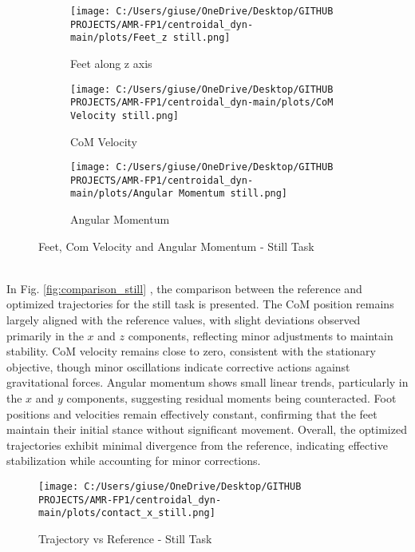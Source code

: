 \documentclass[main.tex]{subfiles}
\begin{document}
\begin{sloppypar}
\begin{figure}[htbp]
    \centering
    \begin{subfigure}[b]{0.32\textwidth}
        \centering
        \texttt{[image: C:/Users/giuse/OneDrive/Desktop/GITHUB PROJECTS/AMR-FP1/centroidal\_dyn-main/plots/Feet\_z still.png]}
        \caption{Feet along z axis}
        \label{fig:feet_z_still}
    \end{subfigure}
    \hfill
    \begin{subfigure}[b]{0.32\textwidth}
        \centering
        \texttt{[image: C:/Users/giuse/OneDrive/Desktop/GITHUB PROJECTS/AMR-FP1/centroidal\_dyn-main/plots/CoM Velocity still.png]}
        \caption{CoM Velocity}
        \label{fig:com_velocity_still}
    \end{subfigure}
    \hfill
    \begin{subfigure}[b]{0.32\textwidth}
        \centering
        \texttt{[image: C:/Users/giuse/OneDrive/Desktop/GITHUB PROJECTS/AMR-FP1/centroidal\_dyn-main/plots/Angular Momentum still.png]}
        \caption{Angular Momentum}
        \label{fig:angular_momentum_still}
    \end{subfigure}
    \caption{Feet, Com Velocity and Angular Momentum - Still Task}
    \label{fig:three_still}
\end{figure}
\\
In Fig. \ref{fig:comparison_still} , the comparison between the reference and optimized trajectories for the still task is presented. The CoM position remains largely aligned with the reference values, with slight deviations observed primarily in the $x$ and $z$ components, reflecting minor adjustments to maintain stability. CoM velocity remains close to zero, consistent with the stationary objective, though minor oscillations indicate corrective actions against gravitational forces. Angular momentum shows small linear trends, particularly in the $x$ and $y$ components, suggesting residual moments being counteracted. Foot positions and velocities remain effectively constant, confirming that the feet maintain their initial stance without significant movement. Overall, the optimized trajectories exhibit minimal divergence from the reference, indicating effective stabilization while accounting for minor corrections.
\begin{figure}[htbp]
    \centering
    \texttt{[image: C:/Users/giuse/OneDrive/Desktop/GITHUB PROJECTS/AMR-FP1/centroidal\_dyn-main/plots/contact\_x\_still.png]}
    \caption{Trajectory vs Reference - Still Task}

\end{figure}
\end{sloppypar}
\end{document}
